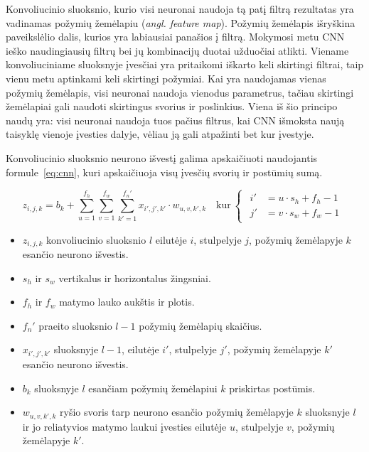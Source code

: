 \documentclass{VUMIFPSbakalaurinis}
\begin{document}
{	Konvoliucinio sluoksnio, kurio visi neuronai naudoja tą patį filtrą rezultatas yra vadinamas požymių žemėlapiu (\textit{angl. feature map}). Požymių žemėlapis išryškina paveikslėlio dalis, kurios yra labiausiai panašios į filtrą. Mokymosi metu CNN ieško naudingiausių filtrų bei jų kombinacijų duotai užduočiai atlikti. Viename konvoliuciniame sluoksnyje įvesčiai yra pritaikomi iškarto keli skirtingi filtrai, taip vienu metu aptinkami keli skirtingi požymiai. Kai yra naudojamas vienas požymių žemėlapis, visi neuronai naudoja vienodus parametrus, tačiau skirtingi žemėlapiai gali naudoti skirtingus svorius ir poslinkius. Viena iš šio principo naudų yra: visi neuronai naudoja tuos pačius filtrus, kai CNN išmoksta naują taisyklę vienoje įvesties dalyje, vėliau ją gali atpažinti bet kur įvestyje. \par
	
	Konvoliucinio sluoksnio neurono išvestį galima apskaičiuoti naudojantis formule~\ref{eq:cnn}, kuri apskaičiuoja visų įvesčių svorių ir postūmių sumą.
	
	\begin{equation}\label{eq:cnn}
		z_{i, j, k} = b_k + \sum_{u=1}^{f_h} \sum_{v=1}^{f_w} \sum_{k'=1}^{f_n'} x_{i', j', k'} \cdot w_{u,v,k',k}
		\quad \textrm{kur} \
		\begin{cases}
			\begin{aligned}
				i' &= u \cdot s_h + f_h - 1 \\
				j' &= v \cdot s_w + f_w - 1 
			\end{aligned}
		\end{cases} 
	\end{equation}
	
	\begin{itemize}
		\item \(z_{i, j, k}\) konvoliucinio sluoksnio \(l\) eilutėje \(i\), stulpelyje \(j\), požymių žemėlapyje \(k\) esančio neurono išvestis.
		\item \(s_h\) ir \(s_w\) vertikalus ir horizontalus žingsniai.
		\item \(f_h\) ir \(f_w\) matymo lauko aukštis ir plotis.
		\item \(f_n'\) praeito sluoksnio \(l-1\) požymių žemėlapių skaičius.
		\item \(x_{i', j', k'}\) sluoksnyje \(l-1\), eilutėje \(i'\), stulpelyje \(j'\), požymių žemėlapyje \(k'\) esančio neurono išvestis.
		\item \(b_k\) sluoksnyje \(l\) esančiam požymių žemėlapiui \(k\) priskirtas postūmis.
		\item \(w_{u,v,k',k}\) ryšio svoris tarp neurono esančio požymių žemėlapyje \(k\) sluoksnyje \(l\) ir jo reliatyvios matymo laukui įvesties eilutėje \(u\), stulpelyje \(v\), požymių žemėlapyje \(k'\).
	\end{itemize}
}	
\end{document}
